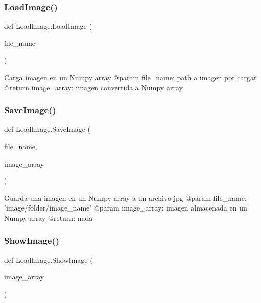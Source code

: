 \subsubsection{\texorpdfstring{Load\+Image()}{LoadImage()}}
{\footnotesize\ttfamily def Load\+Image.\+Load\+Image (\begin{DoxyParamCaption}\item[{}]{file\+\_\+name }\end{DoxyParamCaption})}

\begin{DoxyVerb}Carga imagen en un Numpy array 
@param file_name: path a imagen por cargar
@return image_array: imagen convertida a Numpy array
\end{DoxyVerb}
 \mbox{\label{namespace_load_image_a698cfc61c5d2b157416e98b9edfe5bf6}} 
\subsubsection{\texorpdfstring{Save\+Image()}{SaveImage()}}
{\footnotesize\ttfamily def Load\+Image.\+Save\+Image (\begin{DoxyParamCaption}\item[{}]{file\+\_\+name,  }\item[{}]{image\+\_\+array }\end{DoxyParamCaption})}

\begin{DoxyVerb}Guarda una imagen en un Numpy array a un archivo jpg
@param file_name: 'image/folder/image_name'
@param image_array: imagen almacenada en un Numpy array
@return: nada
\end{DoxyVerb}
 \mbox{\label{namespace_load_image_a226758f3bec41ee132236c4ae4ddf7ba}} 
\subsubsection{\texorpdfstring{Show\+Image()}{ShowImage()}}
{\footnotesize\ttfamily def Load\+Image.\+Show\+Image (\begin{DoxyParamCaption}\item[{}]{image\+\_\+array }\end{DoxyParamCaption})}

